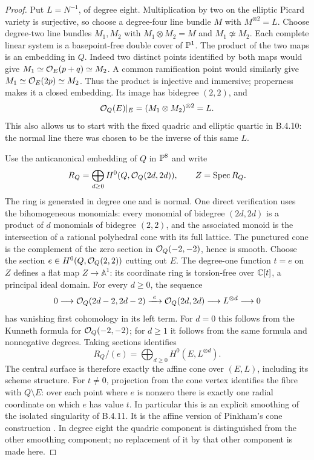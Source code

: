 \begin{proof}
Put $L=N^{-1}$, of degree eight.  Multiplication by two on the
elliptic Picard variety is surjective, so choose a degree-four
line bundle $M$ with $M^{\otimes2}=L$.
Choose degree-two line bundles $M_1,M_2$ with
$M_1\otimes M_2=M$ and $M_1\not\simeq M_2$.
Each complete linear system is a basepoint-free double cover of
$\mathbb P^1$.  The product of the two maps is an embedding in $Q$.
Indeed two distinct points identified by both maps would give
$M_1\simeq\mathcal O_E(p+q)\simeq M_2$.
A common ramification point would similarly give
$M_1\simeq\mathcal O_E(2p)\simeq M_2$.
Thus the product is injective and immersive; properness makes it a
closed embedding.  Its image has bidegree $(2,2)$, and
\[
 \mathcal O_Q(E)|_E=(M_1\otimes M_2)^{\otimes2}=L.
\]
This also allows us to start with the fixed quadric and elliptic
quartic in B.4.10: the normal line there was chosen to be the
inverse of this same $L$.

Use the anticanonical embedding of $Q$ in $\mathbb P^8$ and write
\[
 R_Q=\bigoplus_{d\ge0}H^0(Q,\mathcal O_Q(2d,2d)),\qquad
 Z=\operatorname{Spec}R_Q.
\]
The ring is generated in degree one and is normal.
One direct verification uses the bihomogeneous monomials:
every monomial of bidegree $(2d,2d)$ is a product of $d$
monomials of bidegree $(2,2)$, and the associated monoid is the
intersection of a rational polyhedral cone with its full lattice.
The punctured cone is the complement of the zero section in
$\mathcal O_Q(-2,-2)$, hence is smooth.
Choose the section $e\in H^0(Q,\mathcal O_Q(2,2))$ cutting out $E$.
The degree-one function $t=e$ on $Z$ defines a flat map
$Z\to\mathbb A^1$: its coordinate ring is torsion-free over
$\mathbb C[t]$, a principal ideal domain.
For every $d\ge0$, the sequence
\[
 0\longrightarrow\mathcal O_Q(2d-2,2d-2)
 \xrightarrow{\ e\ }\mathcal O_Q(2d,2d)
 \longrightarrow L^{\otimes d}\longrightarrow0
\]
has vanishing first cohomology in its left term.
For $d=0$ this follows from the Kunneth formula for
$\mathcal O_Q(-2,-2)$; for $d\ge1$ it follows from the same formula
and nonnegative degrees.
Taking sections identifies
\[
 R_Q/(e)=\bigoplus_{d\ge0}H^0(E,L^{\otimes d}).
\]
The central surface is therefore exactly the affine cone over
$(E,L)$, including its scheme structure.
For $t\ne0$, projection from the cone vertex identifies the
fibre with $Q\setminus E$: over each point where $e$ is nonzero
there is exactly one radial coordinate on which $e$ has value $t$.
In particular this is an explicit smoothing of the isolated
singularity of B.4.11.
It is the affine version of Pinkham's cone construction
\citep[Remark~7.6(iii), p.~46; Section~9, pp.~63--65]{Pinkham1974Root}.
In degree eight the quadric component is distinguished from the
other smoothing component; no replacement of it by that other
component is made here.


\end{proof}
